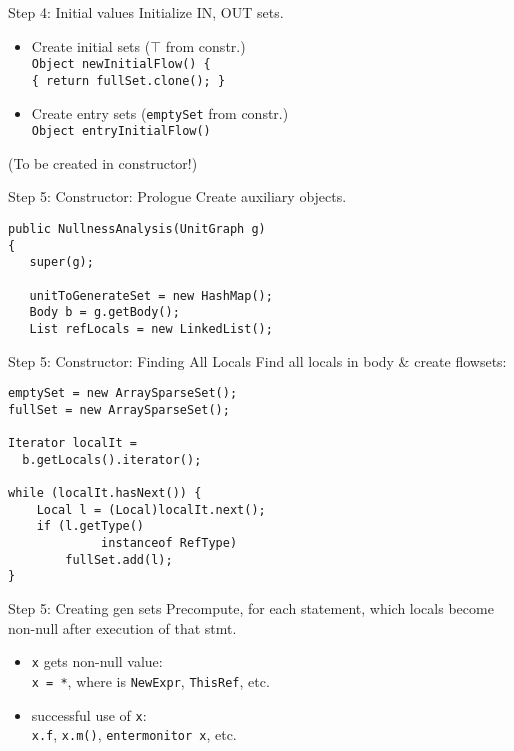 \begin{slide}{Step 4: Initial values}
\vspace*{-0.1in}
Initialize IN, OUT sets.
\begin{itemize}

\item Create initial sets ($\top$ from constr.)\\
{\tt Object newInitialFlow() \{\\
\qquad \tt \{ return fullSet.clone(); \} }

\vspace*{0.1in}

\item Create entry sets ({\tt emptySet} from constr.)\\
{\tt Object entryInitialFlow()}\\
\end{itemize}

(To be created in constructor!)
\end{slide}

\begin{slide}{Step 5: Constructor: Prologue}
\vspace*{-0.1in}
Create auxiliary objects.
\vspace*{0.05in}
\begin{verbatim}
public NullnessAnalysis(UnitGraph g)
{
   super(g);

   unitToGenerateSet = new HashMap();
   Body b = g.getBody();
   List refLocals = new LinkedList();
\end{verbatim}
\end{slide}

\begin{slide}{Step 5: Constructor: Finding All Locals}
\vspace*{-0.2in}
Find all locals in body \& create flowsets:

\vspace*{-0.05in}
\begin{verbatim}
emptySet = new ArraySparseSet();
fullSet = new ArraySparseSet();

Iterator localIt = 
  b.getLocals().iterator();

while (localIt.hasNext()) {
    Local l = (Local)localIt.next();
    if (l.getType() 
             instanceof RefType)
        fullSet.add(l);
}
\end{verbatim}
\end{slide}

\begin{slide}{Step 5: Creating gen sets}
Precompute, for each statement, which locals become non-null after execution of that stmt.

\begin{itemize}
\item {\tt x} gets non-null value:\\
{\tt x = *}, where {\tt *} is {\tt NewExpr}, {\tt ThisRef}, etc.
\item successful use of {\tt x}:\\
{\tt x.f}, {\tt x.m()}, {\tt entermonitor x}, etc.
\end{itemize}
\end{slide}

